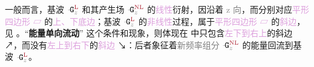 一般而言，\textcolor{NavyBlue}{基波} $\xint{\mathcolor{gray}{-}}{16}{\mathtt{G}}^{\text{\textcolor{Maroon}{L}}}_{\mathcolor{gray}{z}}$ 和\textcolor{NavyBlue}{其产生场} $\xint{\mathcolor{gray}{-}}{16}{\mathtt{G}}^{\text{\textcolor{Maroon}{NL}}}_{\mathcolor{gray}{z}}$ 的\textcolor{Plum}{线性}\textcolor{NavyBlue}{衍射}，因沿着 \textcolor{gray}{z 向}，而分别对应\textcolor{Plum}{平形四边形 ▱} 的\textcolor{Plum}{上、下底边}；\textcolor{NavyBlue}{基波} $\xint{\mathcolor{gray}{-}}{16}{\mathtt{G}}^{\text{\textcolor{Maroon}{L}}}_{\mathcolor{gray}{z}}$ 的\textcolor{Plum}{非线性}过程，属于\textcolor{Plum}{平形四边形 ▱} 的\textcolor{Plum}{斜边}，见 。“\textbf{\textcolor{NavyBlue}{能量}\textcolor{NavyBlue}{单向流动}}” 这个条件和现象，则体现在  中只包含\textcolor{Plum}{左下到右上}的斜边 ↗，而没有\textcolor{Plum}{左上到右下}的\textcolor{Plum}{斜边} ↘：后者象征着\textcolor{gray}{新频率组分} $\xint{\mathcolor{gray}{-}}{16}{\mathtt{G}}^{\text{\textcolor{Maroon}{NL}}}_{\mathcolor{gray}{z}}$ 的\textcolor{NavyBlue}{能量回流}到\textcolor{NavyBlue}{基波} $\xint{\mathcolor{gray}{-}}{16}{\mathtt{G}}^{\text{\textcolor{Maroon}{L}}}_{\mathcolor{gray}{z}}$。


